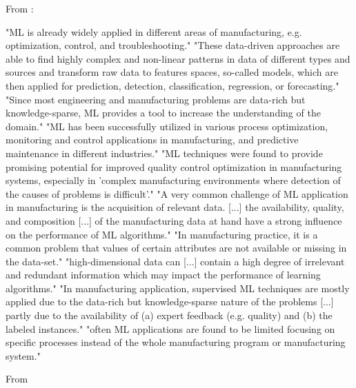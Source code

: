 From \parencite{wuest2016ml_manufacturing} :

"ML is already widely applied in different areas of manufacturing, e.g. optimization, control, and troubleshooting."
"These data-driven approaches are able to find highly complex and non-linear patterns in data of different types and sources and transform raw data to features spaces, so-called models, which are then applied for prediction, detection, classification, regression, or forecasting."
"Since most engineering and manufacturing problems are data-rich but knowledge-sparse, ML provides a tool to increase the understanding of the domain."
"ML has been successfully utilized in various process optimization, monitoring and control applications in manufacturing, and predictive maintenance in different industries."
"ML techniques were found to provide promising potential for improved quality control optimization in manufacturing systems, especially in 'complex manufacturing environments where detection of the causes of problems is difficult'."
"A very common challenge of ML application in manufacturing is the acquisition of relevant data. [...] the availability, quality, and composition [...] of the manufacturing data at hand have a strong influence on the performance of ML algorithms."
"In manufacturing practice, it is a common problem that values of certain attributes are not available or missing in the data-set."
"high-dimensional data can [...] contain a high degree of irrelevant and redundant information which may impact the performance of learning algorithms."
"In manufacturing application, supervised ML techniques are mostly applied due to the data-rich but knowledge-sparse nature of the problems [...] partly due to the availability of (a) expert feedback (e.g. quality) and (b) the labeled instances."
"often ML applications are found to be limited focusing on specific processes instead of the whole manufacturing program or manufacturing system."

From \parencite{weichert2019review_ml_optimization_production}

